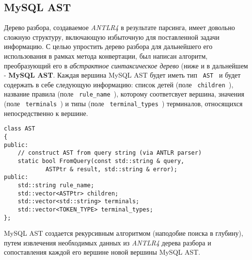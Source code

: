 \subsection{MySQL AST}
Дерево разбора, создаваемое \textit{ANTLR4} в результате парсинга, имеет довольно сложную структуру, включающую избыточную для поставленной задачи информацию. С целью упростить дерево разбора для дальнейшего его использования в рамках метода конвертации, был написан алгоритм, преобразующий его в \textit{абстрактное синтаксическое дерево} (ниже и в дальнейшем - \textbf{MySQL AST}. Каждая вершина MySQL AST будет иметь тип \texttt{ AST } и будет содержать в себе следующую информацию: список детей (поле \texttt{ children }), название правила (поле \texttt{ rule_name }), которому соответсвует вершина, значения (поле \texttt{ terminals }) и типы (поле \texttt{  terminal_types }) терминалов, относящихся непосредственно к вершине. 

\begin{code}
    \label{mysql:AST_cpp}
    \begin{verbatim}
class AST
{
public:
    // construct AST from query string (via ANTLR parser)
    static bool FromQuery(const std::string & query,
            ASTPtr & result, std::string & error);
public:
    std::string rule_name;
    std::vector<ASTPtr> children;
    std::vector<std::string> terminals;
    std::vector<TOKEN_TYPE> terminal_types;
};
    \end{verbatim}
\end{code}

MySQL AST создается рекурсивным алгоритмом (наподобие поиска в глубину), путем извлечения необходимых данных из \textit{ANTLR4} дерева разбора и сопоставления каждой его вершине новой вершины MySQL AST.

\pagebreak
